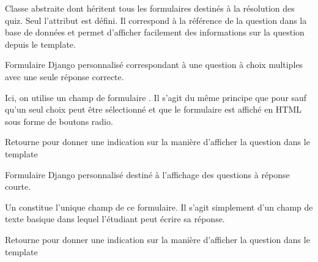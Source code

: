 \documentclass[a4,10pt,french]{sphinxmanual}
\begin{document}

\begin{fulllineitems}
\label{source:quiz.forms.QuestionForm}
Classe abstraite dont héritent tous les formulaires destinés à la résolution
des quiz. Seul l'attribut  est défini. Il correspond à la référence
de la question dans la base de données et permet d'afficher facilement des informations
sur la question depuis le template.

\end{fulllineitems}


\begin{fulllineitems}
\label{source:quiz.forms.RadioForm}
Formulaire Django personnalisé correspondant à une question à choix multiples
avec une seule réponse correcte.

Ici, on utilise un champ de formulaire . Il s'agit du même principe
que pour {\hyperref[source:quiz.forms.CheckboxForm]{\emph{}}} sauf qu'un seul choix peut être sélectionné et
que le formulaire est affiché en HTML sous forme de boutons radio.

\begin{fulllineitems}
\label{source:quiz.forms.RadioForm.get_type}
Retourne  pour donner une indication sur la manière d'afficher 
la question dans le template

\end{fulllineitems}


\end{fulllineitems}


\begin{fulllineitems}
\label{source:quiz.forms.TextForm}
Formulaire Django personnalisé destiné à l'affichage des questions à réponse courte.

Un  constitue l'unique champ de ce formulaire. Il s'agit simplement
d'un champ de texte basique dans lequel l'étudiant peut écrire sa réponse.

\begin{fulllineitems}
\label{source:quiz.forms.TextForm.get_type}
Retourne  pour donner une indication sur la manière d'afficher 
la question dans le template

\end{fulllineitems}


\end{fulllineitems}
\end{document}
